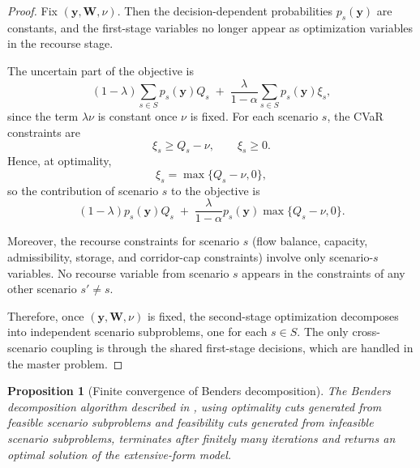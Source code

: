 \documentclass[final,3p,authoryear]{elsarticle}
\newtheorem{proposition}{Proposition}
\theoremstyle{definition}
\begin{document}
\begin{proof}
Fix $(\mathbf{y}, \mathbf{W}, \nu)$. Then the decision-dependent
probabilities $p_s(\mathbf{y})$ are constants, and the first-stage
variables no longer appear as optimization variables in the recourse
stage.

The uncertain part of the objective is
\[
(1-\lambda)\sum_{s\in S} p_s(\mathbf{y}) Q_s
\;+\;
\frac{\lambda}{1-\alpha}\sum_{s\in S} p_s(\mathbf{y}) \xi_s,
\]
since the term $\lambda \nu$ is constant once $\nu$ is fixed. For each
scenario $s$, the CVaR constraints are
\[
\xi_s \ge Q_s - \nu, \qquad \xi_s \ge 0.
\]
Hence, at optimality,
\[
\xi_s = \max\{Q_s-\nu,0\},
\]
so the contribution of scenario $s$ to the objective is
\[
(1-\lambda)p_s(\mathbf{y})Q_s
\;+\;
\frac{\lambda}{1-\alpha}p_s(\mathbf{y})\max\{Q_s-\nu,0\}.
\]

Moreover, the recourse constraints for scenario $s$ (flow balance,
capacity, admissibility, storage, and corridor-cap constraints) involve
only scenario-$s$ variables. No recourse variable from scenario $s$ appears
in the constraints of any other scenario $s' \neq s$.

Therefore, once $(\mathbf{y}, \mathbf{W}, \nu)$ is fixed, the second-stage
optimization decomposes into independent scenario subproblems, one for
each $s \in S$. The only cross-scenario coupling is through the shared
first-stage decisions, which are handled in the master problem.
\end{proof}

\begin{proposition}[Finite convergence of Benders decomposition]
\label{prop:benders_finite}
The Benders decomposition algorithm described in ,
using optimality cuts generated from feasible scenario subproblems and
feasibility cuts generated from infeasible scenario subproblems,
terminates after finitely many iterations and returns an optimal solution
of the extensive-form model.
\end{proposition}
\end{document}
